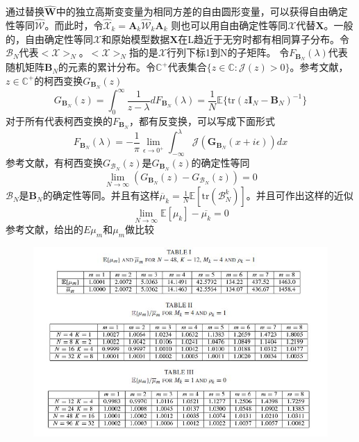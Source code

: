 \documentclass[bachelor,nocolorlinks, printoneside]{seuthesis} %
\begin{document}
\begin{Main}
通过替换$\hat{\mathbf{W}}$中的独立高斯变变量为相同方差的自由圆形变量，可以获得自由确定性等同$\hat{\mathcal{W}}$。而此时，令$\hat{\mathcal{X}}_k = \mathbf{A}_k \hat{\mathcal{W}}_k \mathbf{A}_k$ 则也可以用自由确定性等同$\mathcal{X}$代替$\mathbf{X}$。一般的，自由确定性等同$\mathcal{X}$和原始模型数据$\mathbf{X}$在L趋近于无穷时都有相同算子分布。令$\mathcal{B}_N$代表$<\mathcal{X}>_N$。$<\mathcal{X}>_N$指的是$\mathcal{X}$行列下标1到N的子矩阵。
令$F_{\mathbf{B}_N}(\lambda)$代表随机矩阵$\mathbf{B}_N$的元素的累计分布。令$\mathbb{C}^+$代表集合$\lbrace z\in \mathbb{C}: \mathcal{J}(z) > 0 \rbrace$。参考文献，$z \in \mathbb{C}^+$的柯西变换$G_{\mathbf{B}_N}(z)$
\begin{equation}\label{key}
G_{\mathbf{B}_N}(z) = \int_0^\infty \frac{1}{z-\lambda} dF_{\mathbf{B}_N}(\lambda) = \frac{1}{N} \mathbb{E}\lbrace \mathrm{tr}(z \mathbf{I}_N - \mathbf{B}_N)^{-1}\rbrace
\end{equation}
对于所有代表柯西变换的$F_{\mathbf{B}_N}$，都有反变换，可以写成下面形式
\begin{equation}\label{key}
F_{\mathbf{B}_N}(\lambda) = -\frac{1}{\pi} \lim_{\epsilon \rightarrow 0^+} \int_{-\infty}^{\lambda}  \mathcal{J}(\mathbf{G}_{\mathbf{B}_N}(x+i\epsilon))dx
\end{equation}
参考文献，有柯西变换$G_{\mathcal{B}_N}(z)$是$G_{\mathbf{B}_N}(z)$的确定性等同
\begin{equation}\label{key}
\lim_{N \rightarrow \infty}(G_{\mathbf{B}_N}(z)-G_{\mathcal{B}_N}(z)) = 0
\end{equation}
$\mathcal{B}_N$是$\mathbf{B}_N$的确定性等同。并且有这样$\overline{\mu}_k = \frac{1}{N}\mathbb{E}[\mathrm{tr}(\mathcal{B}_N^k)]$。并且可作出这样的近似
\begin{equation}\label{key}
\lim_{N \rightarrow \infty} \mathbb{E}[\mu_k] -\overline{\mu_k} =0
\end{equation}
参考文献，给出的$E{\mu_m}$和$\mu_m$做比较
\begin{figure}[htbp!]
	\centering \includegraphics[width=1\textwidth]{img/3_6.jpg} 
\end{figure}


\end{Main}
\end{document}
